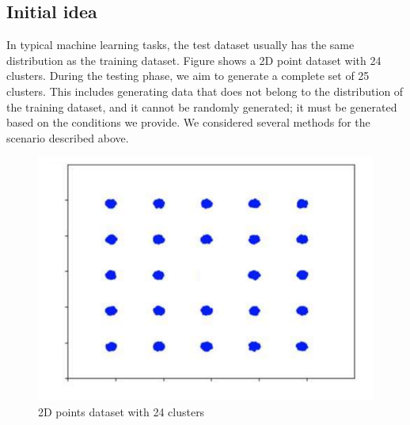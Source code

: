 \subsection{Initial idea}
In typical machine learning tasks, the test dataset usually has the same distribution as the training dataset. Figure shows a 2D point dataset with 24 clusters. During the testing phase, we aim to generate a complete set of 25 clusters. This includes generating data that does not belong to the distribution of the training dataset, and it cannot be randomly generated; it must be generated based on the conditions we provide. We considered several methods for the scenario described above.
 \begin{figure} [H]
        \centering
        \includegraphics[width=0.8\linewidth]{figures/2DPoints.pdf}
        \caption{2D points dataset with 24 clusters}
        \label{fig:2dpoint}
    \end{figure}
